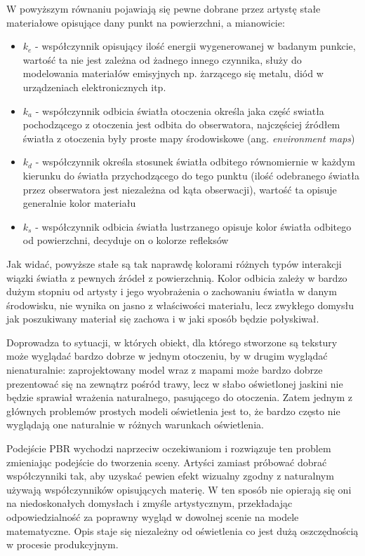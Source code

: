\documentclass[../main.tex]{subfiles}
\begin{document}
W powyższym równaniu pojawiają się pewne dobrane przez artystę stałe materiałowe opisujące dany punkt na powierzchni, a mianowicie:

\begin{itemize}

\item $k_e$ - współczynnik opisujący ilość energii wygenerowanej w badanym punkcie, wartość ta nie jest zależna od żadnego innego czynnika, służy do modelowania materiałów emisyjnych np. żarzącego się metalu, diód w urządzeniach elektronicznych itp.

\item $k_a$ - współczynnik odbicia światła otoczenia określa jaka część swiatła pochodzącego z otoczenia jest odbita do obserwatora, najczęściej źródłem światła z otoczenia były proste mapy środowiskowe (ang. \textit{environment maps})

\item $k_d$ - współczynnik określa stosunek światła odbitego równomiernie w każdym kierunku do światła przychodzącego do tego punktu (ilość odebranego światła przez obserwatora jest niezależna od kąta obserwacji), wartość ta opisuje generalnie kolor materiału

\item $k_s$ - współczynnik odbicia światła lustrzanego opisuje kolor światła odbitego od powierzchni, decyduje on o kolorze refleksów

\end{itemize}

Jak widać, powyższe stałe są tak naprawdę kolorami różnych typów interakcji
wiązki światła z pewnych źródeł z powierzchnią. Kolor odbicia zależy w bardzo
dużym stopniu od artysty i jego wyobrażenia o zachowaniu światła w danym
środowisku, nie wynika on jasno z właściwości materiału, lecz zwykłego domysłu
jak poszukiwany materiał się zachowa i w jaki sposób będzie połyskiwał.

Doprowadza to sytuacji, w których obiekt, dla którego stworzone są tekstury
może wyglądać bardzo dobrze w jednym otoczeniu, by w drugim wyglądać
nienaturalnie: zaprojektowany model wraz z mapami może bardzo dobrze
prezentować się na zewnątrz pośród trawy, lecz w słabo oświetlonej jaskini nie
będzie sprawiał wrażenia naturalnego, pasującego do otoczenia. Zatem jednym z
głównych problemów prostych modeli oświetlenia jest to, że bardzo często nie
wyglądają one naturalnie w różnych warunkach oświetlenia.

Podejście PBR wychodzi naprzeciw oczekiwaniom i rozwiązuje ten problem
zmieniając podejście do tworzenia sceny. Artyści zamiast próbować dobrać
współczynniki tak, aby uzyskać pewien efekt wizualny zgodny z naturalnym
używają współczynników opisujących materię. W ten sposób nie opierają się oni
na niedoskonałych domysłach i zmyśle artystycznym, przekładając
odpowiedzialność za poprawny wygląd w dowolnej scenie na modele matematyczne.
Opis staje się niezależny od oświetlenia co jest dużą oszczędnością w procesie
produkcyjnym.
\end{document}
